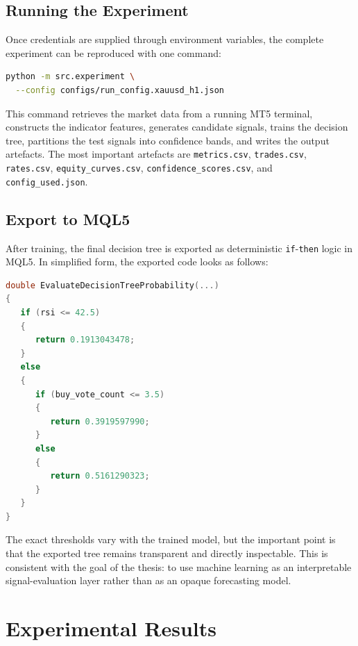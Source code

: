 \subsection{Running the Experiment}

Once credentials are supplied through environment variables, the complete
experiment can be reproduced with one command:

\begin{lstlisting}[language=bash,caption={Running the thesis experiment from the command line.}]
python -m src.experiment \
  --config configs/run_config.xauusd_h1.json
\end{lstlisting}

This command retrieves the market data from a running MT5 terminal, constructs
the indicator features, generates candidate signals, trains the decision tree,
partitions the test signals into confidence bands, and writes the output
artefacts. The most important artefacts are \texttt{metrics.csv},
\texttt{trades.csv}, \texttt{rates.csv}, \texttt{equity\_curves.csv},
\texttt{confidence\_scores.csv}, and \texttt{config\_used.json}.

\subsection{Export to MQL5}

After training, the final decision tree is exported as deterministic
\texttt{if}-\texttt{then} logic in MQL5. In simplified form, the exported code
looks as follows:

\begin{lstlisting}[language=C++,caption={Simplified structure of the exported MQL5 decision tree.}]
double EvaluateDecisionTreeProbability(...)
{
   if (rsi <= 42.5)
   {
      return 0.1913043478;
   }
   else
   {
      if (buy_vote_count <= 3.5)
      {
         return 0.3919597990;
      }
      else
      {
         return 0.5161290323;
      }
   }
}
\end{lstlisting}

The exact thresholds vary with the trained model, but the important point is
that the exported tree remains transparent and directly inspectable. This is
consistent with the goal of the thesis: to use machine learning as an
interpretable signal-evaluation layer rather than as an opaque forecasting
model.

\section{Experimental Results}

